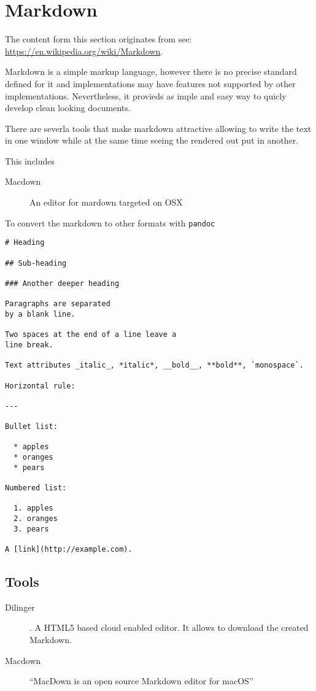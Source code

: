 \FILENAME

\section{Markdown}\label{S:markdown}

The content form this section originates from see:
\url{https://en.wikipedia.org/wiki/Markdown}.

Markdown is a simple markup language, however there is no precise
standard defined for it and implementations may have features not
supported by other implementations. Nevertheless, it provieds as imple
and easy way to quicly develop clean looking documents.

There are severla tools that make markdown attractive allowing to
write the text in one window while at the same time seeing the
rendered out put in another.

This includes

\begin{description}

\item[Macdown] An editor for mardown targeted on OSX

\end{description}

To convert the markdown to other formats with \verb|pandoc|

\begin{verbatim}
# Heading

## Sub-heading

### Another deeper heading
 
Paragraphs are separated
by a blank line.

Two spaces at the end of a line leave a  
line break.

Text attributes _italic_, *italic*, __bold__, **bold**, `monospace`.

Horizontal rule:

---

Bullet list:

  * apples
  * oranges
  * pears

Numbered list:

  1. apples
  2. oranges
  3. pears

A [link](http://example.com).

\end{verbatim}

\subsection{Tools}

\begin{description}
\item [Dilinger] . A HTML5 based cloud
  enabled editor. It allows to download the created Markdown.
\item[Macdown]  ``MacDown is an
  open source Markdown editor for macOS''
\end{description}